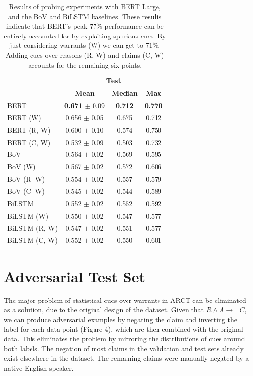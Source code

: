 \documentclass[11pt,a4paper]{article}
\begin{document}
\begin{table}[t]
\begin{center}
\small
\begin{tabular}{|l|ccc|}
\hline
\multirow{2}{*}{} & \multicolumn{3}{c|}{\textbf{Test}} \\
& \textbf{Mean} & \textbf{Median} & \textbf{Max} \\
\hline
BERT & \textbf{0.671} $\pm$ 0.09 & \textbf{0.712} & \textbf{0.770} \\
BERT (W) & 0.656 $\pm$ 0.05 & 0.675 & 0.712 \\
BERT (R, W) & 0.600 $\pm$ 0.10 & 0.574 & 0.750 \\
BERT (C, W) & 0.532 $\pm$ 0.09 & 0.503 & 0.732 \\
\hline
BoV & 0.564 $\pm$ 0.02 & 0.569 & 0.595 \\
BoV (W) & 0.567 $\pm$ 0.02 & 0.572 & 0.606 \\
BoV (R, W) & 0.554 $\pm$ 0.02 & 0.557 & 0.579 \\
BoV (C, W) & 0.545 $\pm$ 0.02 & 0.544 & 0.589 \\
\hline
BiLSTM & 0.552 $\pm$ 0.02 & 0.552 & 0.592 \\
BiLSTM (W) & 0.550 $\pm$ 0.02 & 0.547 & 0.577 \\
BiLSTM (R, W) & 0.547 $\pm$ 0.02 & 0.551 & 0.577 \\
BiLSTM (C, W) & 0.552 $\pm$ 0.02 & 0.550 & 0.601 \\
\hline
\end{tabular}
\end{center}
\caption{Results of probing experiments with BERT Large, and the BoV and BiLSTM baselines. These results indicate that BERT's peak $77\%$ performance can be entirely accounted for by exploiting spurious cues. By just considering warrants (W) we can get to $71\%$. Adding cues over reasons (R, W) and claims (C, W) accounts for the remaining six points.}
\end{table}

\section{Adversarial Test Set}

The major problem of statistical cues over warrants in ARCT can be eliminated as a solution, due to the original design of the dataset. Given that $R \land A \rightarrow \lnot C$, we can produce adversarial examples by negating the claim and inverting the label for each data point (Figure 4), which are then combined with the original data. This eliminates the problem by mirroring the distributions of cues around both labels. The negation of most claims in the validation and test sets already exist elsewhere in the dataset. The remaining claims were manually negated by a native English speaker.
\end{document}

